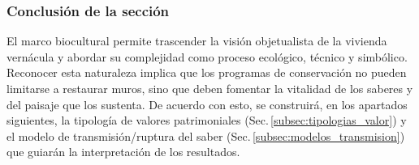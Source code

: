 \subsubsection{Conclusión de la sección}

El marco biocultural permite trascender la visión objetualista de la
vivienda vernácula y abordar su complejidad como proceso ecológico,
técnico y simbólico.  Reconocer esta naturaleza implica que los
programas de conservación no pueden limitarse a restaurar muros, sino
que deben fomentar la vitalidad de los saberes y del paisaje que los
sustenta. De acuerdo con esto, se construirá, en los apartados
siguientes, la tipología de valores patrimoniales (Sec.\,\ref{subsec:tipologias_valor})
y el modelo de transmisión/ruptura del saber (Sec.\,\ref{subsec:modelos_transmision})
que guiarán la interpretación de los resultados.


